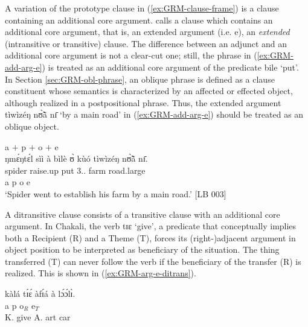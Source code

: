 \z 
 \z



A variation of the prototype  clause in (\ref{ex:GRM-clause-frame}) is a
clause containing an additional core argument.  \citet[116]{Dixo10b} calls  a
clause which contains an
additional core argument, that is,  an extended argument (i.e. {\sc e}), an
{\it extended} (intransitive or transitive) clause. The
difference between an adjunct and an additional core argument is not a clear-cut
one;   still,   the  phrase in (\ref{ex:GRM-add-arg-e}) is treated as
  an additional core argument of the predicate {\sls bile} `put'. In Section
\ref{sec:GRM-obl-phrase}, an oblique phrase is defined as a clause constituent whose semantics is
characterized by an  affected or effected object, although realized in a
postpositional phrase. Thus, the extended argument {\sls  tìwìzéŋ nʊ̃̀ã̀  nɪ̄}   `by a main road' in (\ref{ex:GRM-add-arg-e}) should be treated as an oblique object. 

\newpage 

\ea\label{ex:GRM-add-arg-e}{{\sc a} $+$ {\sc p}  $+$  {\sc o} $+$   {\sc e}}\\
\glll ŋmɛ́ŋtɛ́l sìì à bìlè  ʊ̀  kùó  tìwìzéŋ nʊ̃̀ã̀  nɪ̄.\\
spider raise.up   {\conn} put {3.\sg.\poss}   farm road.large  {\reln}  {\postp}\\
{\sc a}  {\sc p} {} {}    {\sc o} {}    {\sc e} {}  {} \\

\glt  `Spider went to establish his farm by a main road.' [LB 003]

\z

A ditransitive clause consists of a transitive clause with an additional core argument.  In Chakali, the verb {\sls tɪɛ} `give', a predicate that conceptually implies both a Recipient (R)  and a Theme (T), forces its (right-)adjacent argument in object position to be interpreted as  beneficiary of the situation. The thing transferred (T) can never follow the verb if the beneficiary of the transfer (R) is realized. This is shown in (\ref{ex:GRM-arg-e-ditrans}).

\ea\label{ex:GRM-arg-e-ditrans}

 \ea\label{ex:GRM-arg-e-ditrans-ben-the-1}
\glll kàlá tɪ́ɛ́ àfɪ́á {à lɔ́ɔ́lɪ̀}.\\
{\sc a} {\sc p} {\sc o}$_{R}$ {\sc e}$_{T}$\\
K. give A.  {{\sc art} car}\\

